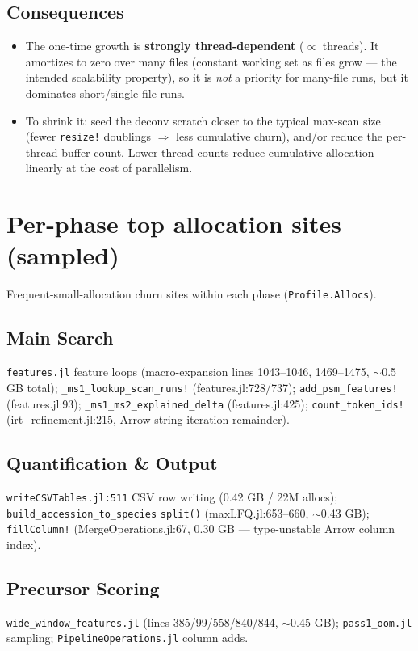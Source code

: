 \documentclass[11pt]{article}
\begin{document}
\subsection{Consequences}
\begin{itemize}
  \item The one-time growth is \textbf{strongly thread-dependent} ($\propto$ threads).
        It amortizes to zero over many files (constant working set as files grow ---
        the intended scalability property), so it is \emph{not} a priority for
        many-file runs, but it dominates short/single-file runs.
  \item To shrink it: seed the deconv scratch closer to the typical max-scan size (fewer
        \texttt{resize!} doublings $\Rightarrow$ less cumulative churn), and/or reduce the
        per-thread buffer count. Lower thread counts reduce cumulative allocation
        linearly at the cost of parallelism.
\end{itemize}

\section{Per-phase top allocation sites (sampled)}
Frequent-small-allocation churn sites within each phase (\texttt{Profile.Allocs}).
\subsection*{Main Search}
\texttt{features.jl} feature loops (macro-expansion lines 1043--1046, 1469--1475,
$\sim$0.5 GB total); \texttt{\_ms1\_lookup\_scan\_runs!} (features.jl:728/737);
\texttt{add\_psm\_features!} (features.jl:93); \texttt{\_ms1\_ms2\_explained\_delta}
(features.jl:425); \texttt{count\_token\_ids!} (irt\_refinement.jl:215, Arrow-string
iteration remainder).
\subsection*{Quantification \& Output}
\texttt{writeCSVTables.jl:511} CSV row writing (0.42 GB / 22M allocs);
\texttt{build\_accession\_to\_species} \texttt{split()} (maxLFQ.jl:653--660, $\sim$0.43 GB);
\texttt{fillColumn!} (MergeOperations.jl:67, 0.30 GB --- type-unstable Arrow column index).
\subsection*{Precursor Scoring}
\texttt{wide\_window\_features.jl} (lines 385/99/558/840/844, $\sim$0.45 GB);
\texttt{pass1\_oom.jl} sampling; \texttt{PipelineOperations.jl} column adds.
\end{document}
